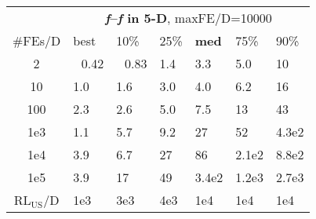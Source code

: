 \begin{tabular}{c|llllll}
 & \multicolumn{6}{|c}{\textbf{\textit{f}\raisebox{-0.35ex}{1}--\textit{f}\raisebox{-0.35ex}{24} in 5-D}, maxFE/D=10000}\\
\#FEs/D & best & 10\% & 25\% & \textbf{med} & 75\% & 90\%\\
2 & ~\,0.42 & ~\,0.83 & \hspace*{1ex}1.4 & \hspace*{1ex}3.3 & \hspace*{1ex}5.0 & 10\\
10 & \hspace*{1ex}1.0 & \hspace*{1ex}1.6 & \hspace*{1ex}3.0 & \hspace*{1ex}4.0 & \hspace*{1ex}6.2 & 16\\
100 & \hspace*{1ex}2.3 & \hspace*{1ex}2.6 & \hspace*{1ex}5.0 & \hspace*{1ex}7.5 & 13 & 43\\
1e3 & \hspace*{1ex}1.1 & \hspace*{1ex}5.7 & \hspace*{1ex}9.2 & 27 & 52 & 4.3e2\\
1e4 & \hspace*{1ex}3.9 & \hspace*{1ex}6.7 & 27 & 86 & 2.1e2 & 8.8e2\\
1e5 & \hspace*{1ex}3.9 & 17 & 49 & 3.4e2 & 1.2e3 & 2.7e3\\
$\text{RL}_{\text{US}}$/D & 1e3 & 3e3 & 4e3 & 1e4 & 1e4 & 1e4
\end{tabular}
